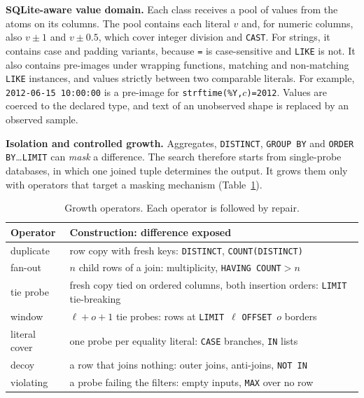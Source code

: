 \textbf{SQLite-aware value domain.} Each class receives a pool of values from the atoms on its columns. The pool contains each literal $v$ and, for numeric columns, also $v\pm1$ and $v\pm0.5$, which cover integer division and \texttt{CAST}. For strings, it contains case and padding variants, because \texttt{=} is case-sensitive and \texttt{LIKE} is not. It also contains pre-images under wrapping functions, matching and non-matching \texttt{LIKE} instances, and values strictly between two comparable literals. For example, \texttt{\textquotesingle{}2012-06-15 10:00:00\textquotesingle{}} is a pre-image for \texttt{strftime(\textquotesingle{}\%Y\textquotesingle{},$c$)=\textquotesingle{}2012\textquotesingle{}}. Values are coerced to the declared type, and text of an unobserved shape is replaced by an observed sample.

\textbf{Isolation and controlled growth.} Aggregates, \texttt{DISTINCT}, \texttt{GROUP BY} and \texttt{ORDER BY}\dots\texttt{LIMIT} can \emph{mask} a difference. The search therefore starts from single-probe databases, in which one joined tuple determines the output. It grows them only with operators that target a masking mechanism (Table~\ref{tab:operators}).

\begin{table}[!htbp]
\centering\footnotesize
\caption{Growth operators. Each operator is followed by repair.}\label{tab:operators}
\begin{tabularx}{\linewidth}{@{}l>{\raggedright\arraybackslash}X@{}}
\toprule
Operator & Construction: difference exposed\\
\midrule
duplicate & row copy with fresh keys: \texttt{DISTINCT}, \texttt{COUNT(DISTINCT)}\\
fan-out & $n$ child rows of a join: multiplicity, \texttt{HAVING COUNT}$>n$\\
tie probe & fresh copy tied on ordered columns, both insertion orders: \texttt{LIMIT} tie-breaking\\
window & $\ell{+}o{+}1$ tie probes: rows at \texttt{LIMIT}~$\ell$ \texttt{OFFSET}~$o$ borders\\
literal cover & one probe per equality literal: \texttt{CASE} branches, \texttt{IN} lists\\
decoy & a row that joins nothing: outer joins, anti-joins, \texttt{NOT IN}\\
violating & a probe failing the filters: empty inputs, \texttt{MAX} over no row\\
\bottomrule
\end{tabularx}
\end{table}

